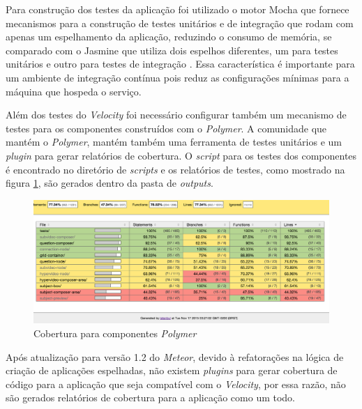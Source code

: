 Para construção dos testes da aplicação foi utilizado o motor Mocha que fornece mecanismos para a construção de testes unitários e de integração que rodam com apenas um espelhamento da aplicação, reduzindo o consumo de memória, se comparado com o Jasmine que utiliza dois espelhos diferentes, um para testes unitários e outro para testes de integração \cite{jasmine2015}. Essa característica é importante para um ambiente de integração contínua pois reduz as configurações mínimas para a máquina que hospeda o serviço.

Além dos testes do \textit{Velocity} foi necessário configurar também um mecanismo de testes para os componentes construídos com o \textit{Polymer}. A comunidade que mantém o \textit{Polymer}, mantém também uma ferramenta de testes unitários e um \textit{plugin} para gerar relatórios de cobertura. O \textit{script} para os testes dos componentes é encontrado no diretório de \textit{scripts} e os relatórios de testes, como mostrado na figura \ref{fig:teste_polymer}, são gerados dentro da pasta de \textit{outputs}.

\begin{figure}[h!]
  	\centering
  	\includegraphics[width=.8\linewidth]{figuras/teste_polymer.eps}
  	\caption{Cobertura para componentes \textit{Polymer}}
  	\label{fig:teste_polymer}
\end{figure}

Após atualização para versão 1.2 do \textit{Meteor}, devido à refatorações na lógica de criação de aplicações espelhadas, não existem \textit{plugins} para gerar cobertura de código para a aplicação que seja compatível com o \textit{Velocity}, por essa razão, não são gerados relatórios de cobertura para a aplicação como um todo.

